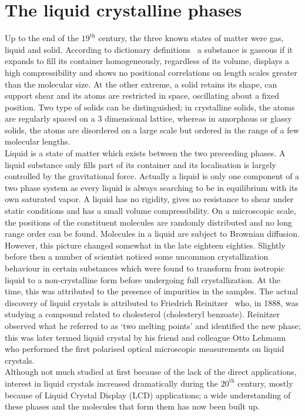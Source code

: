 
\chapter{The liquid crystalline phases}
\label{chap:one}

\introduction

Up to the end of the $19^{\mathrm{th}}$ century, the three known states of matter were gas,
liquid and solid. According to dictionary definitions~\cite{physicsDictionary, structMatter} 
a substance is gaseous if it expands to fill its container homogeneously, regardless of its volume, 
displays a high compressibility and shows no positional correlations on length scales greater than
the molecular size. At the other extreme, a solid retains its shape, can support shear and its
atoms are restricted in space, oscillating about a fixed position. Two type of solids
can be distinguished; in crystalline solids, the atoms are regularly spaced on a 3 dimensional
lattice, whereas in amorphous or glassy solids, the atoms are disordered on a large scale
but ordered in the range of a few molecular lengths.\\
Liquid is a state of matter which exists between the two preceeding phases. A liquid substance 
only fills part of its container and its localisation is largely controlled by the gravitational 
force. Actually a liquid is only one component of a two phase system as every liquid is always 
searching to be in equilibrium with its own saturated vapor. A liquid has no rigidity, gives 
no resistance to shear under static conditions and has a small volume compressibility. On a 
microscopic scale, the positions of the constituent molecules are randomly distributed and no 
long range order can be found. Molecules in a liquid are subject to Brownian diffusion.\\

However, this picture changed somewhat in the late eighteen eighties. Slightly before then a number 
of scientist noticed some uncommon crystallization behaviour in certain substances which were
found to  transform from isotropic
liquid to a non-crystalline form before undergoing full crystallization. At the time, this
was attributed to the presence of impurities in the samples. The actual discovery of liquid
crystals is attributed to Friedrich Reinitzer~\cite{Reinitzer88} who, in 1888, was studying 
a compound related to cholesterol (cholesteryl benzoate). Reinitzer observed what he referred 
to as `two melting points' and identified the new phase; this was later termed liquid crystal 
by his friend and colleague Otto Lehmann~\cite{Lehmann89} who performed the first polarised 
optical microscopic measurements on liquid crystals.\\
Although not much studied at first because of the lack of the direct applications, 
interest in liquid crystals increased dramatically during the $20^{\mathrm{th}}$ century, mostly 
because of Liquid Crystal Display (LCD) applications; a wide understanding of these phases and 
the molecules that form them has now been built up.



